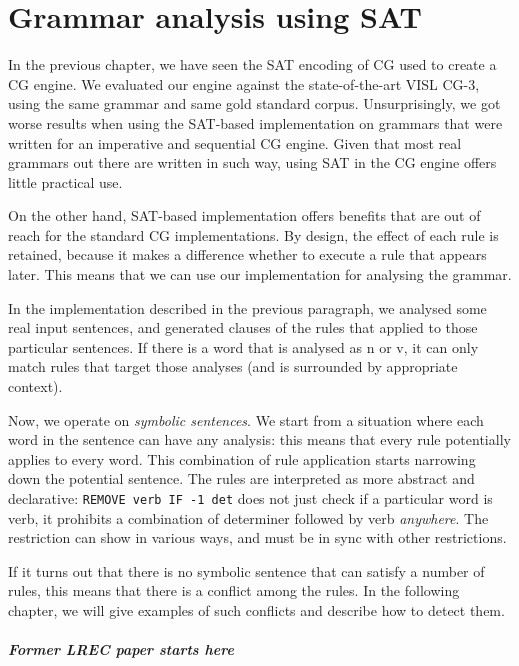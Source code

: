 \chapter{Grammar analysis using SAT}
\label{chapterCGana}

In the previous chapter, we have seen the SAT encoding of CG used to
create a CG engine.
We evaluated our engine against the state-of-the-art VISL CG-3, using
the same grammar and same gold standard corpus.
Unsurprisingly, we got worse results when using the SAT-based
implementation on grammars that were written for an imperative and
sequential CG engine. Given that most real grammars out there are
written in such way, using SAT in the CG engine offers little
practical use.

On the other hand, SAT-based implementation offers benefits that are
out of reach for the standard CG implementations. By design, the
effect of each rule is retained, because it makes a difference whether
to execute a rule that appears later. This means that we can use our
implementation for analysing the grammar.

In the implementation described in the previous paragraph, we analysed
some real input sentences, and generated clauses of the rules that
applied to those particular sentences. If there is a word that is
analysed as n or v, it can only match rules that target those analyses
(and is surrounded by appropriate context).

Now, we operate on \emph{symbolic sentences}. We start from a
situation where each word in the sentence can have any analysis: this
means that every rule potentially applies to every word. This
combination of rule application starts narrowing down the potential
sentence.
The rules are interpreted as more abstract and declarative:
\texttt{REMOVE verb IF -1 det} does not just check if a particular
word is verb, it prohibits a combination of determiner followed by
verb \emph{anywhere}. The restriction can show in various ways, 
and must be in sync with other restrictions.

If it turns out that there is no symbolic sentence that can satisfy a
number of rules, this means that there is a conflict among the
rules. In the following chapter, we will give examples of such
conflicts and describe how to detect them.



\paragraph{Former LREC paper starts here}

